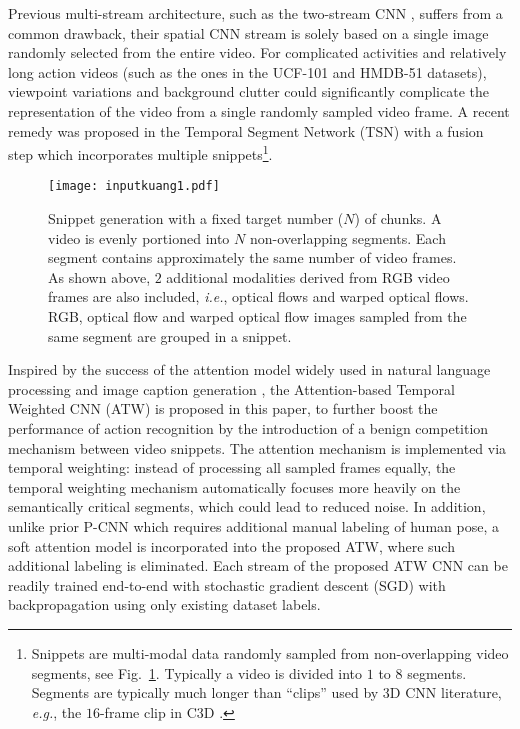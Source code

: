 \documentclass[runningheads,a4paper]{llncs}
\begin{document}
Previous multi-stream architecture, such as the two-stream CNN \cite{simonyan2014two}, suffers from a common drawback, their spatial CNN stream is solely based on a single image randomly selected from the entire video. For complicated activities and relatively long action videos (such as the ones in the UCF-101 and HMDB-51 datasets), viewpoint variations and background clutter could significantly complicate the representation of the video from a single randomly sampled video frame. A recent remedy was proposed in the Temporal Segment Network (TSN) \cite{wang2016temporal} with a fusion step which incorporates multiple snippets\footnote{Snippets are multi-modal data randomly sampled from non-overlapping video segments, see Fig.~\ref{fig:input}. Typically a video is divided into $1$ to $8$ segments. Segments are typically much longer than ``clips'' used by 3D CNN literature, {\em e.g.}, the $16$-frame clip in C3D \cite{tran2015learning}.}.

\begin{figure}[t]
	\centering
	\texttt{[image: inputkuang1.pdf]}
	\caption{Snippet generation with a fixed target number ($N$) of chunks. A video is evenly portioned into $N$
	non-overlapping segments. Each segment contains approximately the same number of video frames.
	As shown above, $2$ additional modalities derived from RGB video frames are also included, {\em i.e.},
	optical flows and warped optical flows. RGB, optical flow and warped optical flow images sampled
	from the same segment are grouped in a snippet.}
	\label{fig:input}
\end{figure}

Inspired by the success of the attention model widely used in natural language processing \cite{luong2015effective} and image caption generation \cite{xu2015show,mnih2014recurrent}, the Attention-based Temporal Weighted CNN (ATW) is proposed in this paper, to further boost the performance of action recognition by the introduction of a benign competition mechanism between video snippets.  The attention mechanism is implemented via temporal weighting: instead of processing all sampled frames equally, the temporal weighting mechanism automatically focuses more heavily on the semantically critical segments, which could lead to reduced noise.  In addition, unlike prior P-CNN \cite{cheron2015p} which requires additional manual labeling of human pose, a soft attention model is incorporated into the proposed ATW, where such additional labeling is eliminated. Each stream of the proposed ATW CNN can be readily trained end-to-end with stochastic gradient descent (SGD) with backpropagation using only existing dataset labels.
\end{document}

